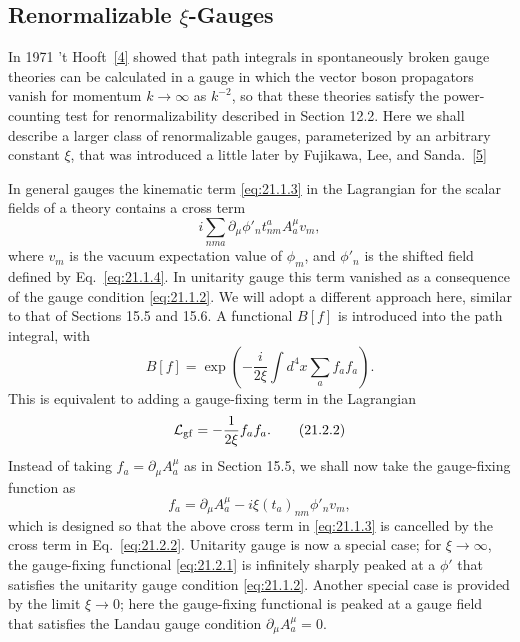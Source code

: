 \subsection{\texorpdfstring{Renormalizable $\xi$-Gauges}{Renormalizable xi-Gauges}}
\label{sec:21.2}

In 1971 't Hooft~\hyperref[ch21-ref-4]{[4]} showed that path integrals in
spontaneously broken gauge theories can be calculated in a gauge in which
the vector boson propagators vanish for momentum $k\to\infty$ as $k^{-2}$,
so that these theories satisfy the power-counting test for renormalizability
described in Section 12.2. Here we shall describe a larger class of
renormalizable gauges, parameterized by an arbitrary constant $\xi$, that
was introduced a little later by Fujikawa, Lee, and
Sanda.~\hyperref[ch21-ref-5]{[5]}

In general gauges the kinematic term \eqref{eq:21.1.3} in the Lagrangian for
the scalar fields of a theory contains a cross term
\begin{equation*}
 i\sum_{nma}\partial_\mu\phi'_n
 t^a_{nm}A_a^\mu v_m,
\end{equation*}
where $v_m$ is the vacuum expectation value of $\phi_m$, and $\phi'_n$ is
the shifted field defined by Eq.~\eqref{eq:21.1.4}. In unitarity gauge this
term vanished as a consequence of the gauge condition \eqref{eq:21.1.2}.
We will adopt a different approach here, similar to that of Sections 15.5
and 15.6. A functional $B[f]$ is introduced into the path integral, with
\begin{equation}
 B[f]=\exp\left(
 -\frac{i}{2\xi}\int d^4x\sum_a f_a f_a
 \right).
 \tag{21.2.1}\label{eq:21.2.1}
\end{equation}
This is equivalent to adding a gauge-fixing term in the Lagrangian
\begin{equation}
 \mathcal L_{\rm gf}=-\frac1{2\xi}f_a f_a.
 \tag{21.2.2}\label{eq:21.2.2}
\end{equation}
Instead of taking $f_a=\partial_\mu A_a^\mu$ as in Section 15.5,
we shall now take the gauge-fixing function as
\begin{equation}
 f_a=\partial_\mu A_a^\mu
 -i\xi(t_a)_{nm}\phi'_n v_m,
 \tag{21.2.3}\label{eq:21.2.3}
\end{equation}
which is designed so that the above cross term in \eqref{eq:21.1.3} is
cancelled by the cross term in Eq.~\eqref{eq:21.2.2}. Unitarity gauge is now
a special case; for $\xi\to\infty$, the gauge-fixing functional
\eqref{eq:21.2.1} is infinitely sharply peaked at a $\phi'$ that satisfies
the unitarity gauge condition \eqref{eq:21.1.2}. Another special case is
provided by the limit $\xi\to0$; here the gauge-fixing functional is peaked
at a gauge field that satisfies the Landau gauge condition
$\partial_\mu A_a^\mu=0$.

